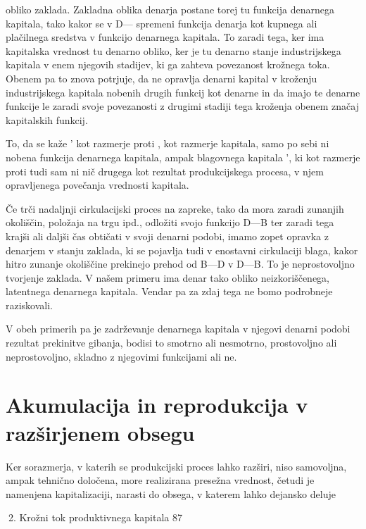 \documentclass[kapital_02.tex]{subfiles}
\begin{document}
 obliko zaklada. Zakladna oblika denarja postane torej tu funkcija denarnega kapitala, tako kakor se v D— \KPEB spremeni funkcija denarja kot kupnega ali plačilnega sredstva v funkcijo denarnega kapitala. To zaradi tega, ker ima kapitalska vrednost tu denarno obliko, ker je tu denarno stanje industrijskega kapitala v enem njegovih stadijev, ki ga zahteva povezanost krožnega toka. Obenem pa to znova potrjuje, da ne opravlja denarni kapital v kroženju industrijskega kapitala nobenih drugih funkcij kot denarne in da imajo te denarne funkcije le zaradi svoje povezanosti z drugimi stadiji tega kroženja obenem značaj kapitalskih funkcij.

To, da se kaže \KPED' kot razmerje \KPEd proti \KPED, kot razmerje kapitala, samo po sebi ni nobena funkcija denarnega kapitala, ampak blagovnega kapitala \KPEB', ki kot razmerje \KPEb proti \KPEB tudi sam ni nič drugega kot rezultat produkcijskega procesa, v njem opravljenega povečanja vrednosti kapitala.

Če trči nadaljnji cirkulacijski proces na zapreke, tako da mora \KPED zaradi zunanjih okoliščin, položaja na trgu ipd., odložiti svojo funkcijo D—B ter zaradi tega krajši ali daljši čas obtičati v svoji denarni podobi, imamo zopet opravka z denarjem v stanju zaklada, ki se pojavlja tudi v enostavni cirkulaciji blaga, kakor hitro zunanje okoliščine prekinejo prehod od B—D v D—B. To je neprostovoljno tvorjenje zaklada. V našem primeru ima denar tako obliko neizkoriščenega, latentnega denarnega kapitala. Vendar pa za zdaj tega ne bomo podrobneje raziskovali.

V obeh primerih pa je zadrževanje denarnega kapitala v njegovi denarni podobi rezultat prekinitve gibanja, bodisi to smotrno ali nesmotrno, prostovoljno ali neprostovoljno, skladno z njegovimi funkcijami ali ne.

\section{Akumulacija in reprodukcija v razširjenem obsegu}

Ker sorazmerja, v katerih se produkcijski proces lahko razširi, niso samovoljna, ampak tehnično določena, more realizirana presežna vrednost, četudi je namenjena kapitalizaciji, narasti do obsega, v katerem lahko dejansko deluje



2. Krožni tok produktivnega kapitala 87
\end{document}
